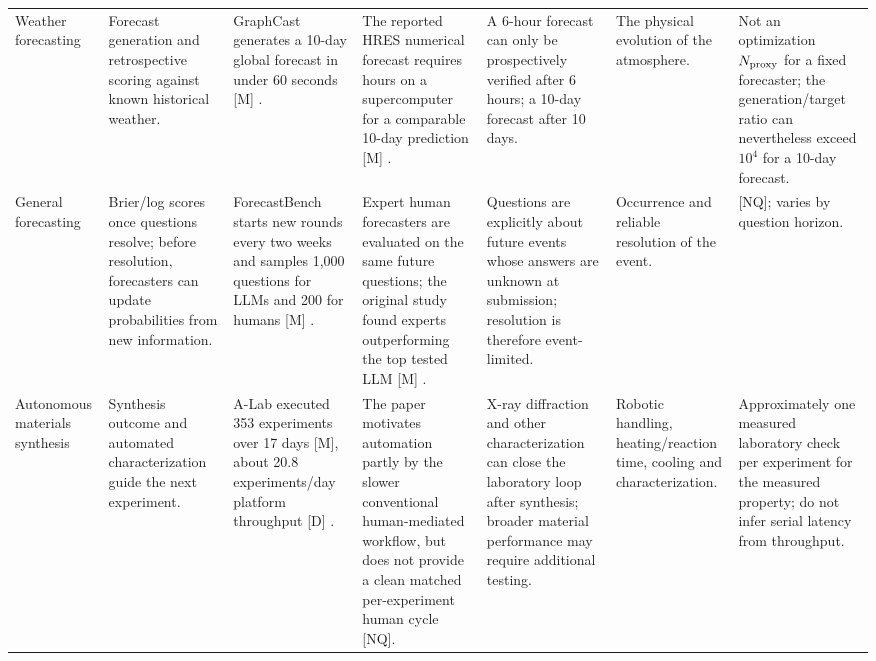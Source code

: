 \begin{landscape}
\begin{center}
\begin{longtable}{
    @{}
    p{2.0cm}
    p{3.0cm}
    p{2.85cm}
    p{2.75cm}
    p{3.05cm}
    p{2.75cm}
    p{2.55cm}
    @{}
}
\\[3pt]

Weather forecasting
&
Forecast generation and retrospective scoring against known historical
weather.
&
GraphCast generates a 10-day global forecast in under 60 seconds [M]
\parencite{lam2023graphcast}.
&
The reported HRES numerical forecast requires hours on a
supercomputer for a comparable 10-day prediction [M]
\parencite{lam2023graphcast}.
&
A 6-hour forecast can only be prospectively verified after 6 hours; a
10-day forecast after 10 days.
&
The physical evolution of the atmosphere.
&
Not an optimization $N_{\mathrm{proxy}}$ for a fixed forecaster; the generation/target
ratio can nevertheless exceed $10^4$ for a 10-day forecast.

\\[3pt]

General forecasting
&
Brier/log scores once questions resolve; before resolution, forecasters
can update probabilities from new information.
&
ForecastBench starts new rounds every two weeks and samples 1,000
questions for LLMs and 200 for humans [M]
\parencite{karger2025forecastbench}.
&
Expert human forecasters are evaluated on the same future questions;
the original study found experts outperforming the top tested LLM
[M] \parencite{karger2025forecastbench}.
&
Questions are explicitly about future events whose answers are unknown
at submission; resolution is therefore event-limited.
&
Occurrence and reliable resolution of the event.
&
[NQ]; varies by question horizon.

\\[3pt]

Autonomous materials synthesis
&
Synthesis outcome and automated characterization guide the next
experiment.
&
A-Lab executed 353 experiments over 17 days [M], about
20.8 experiments/day platform throughput [D]
\parencite{szymanski2023alab}.
&
The paper motivates automation partly by the slower conventional
human-mediated workflow, but does not provide a clean matched
per-experiment human cycle [NQ].
&
X-ray diffraction and other characterization can close the laboratory
loop after synthesis; broader material performance may require
additional testing.
&
Robotic handling, heating/reaction time, cooling and characterization.
&
Approximately one measured laboratory check per experiment for the
measured property; do not infer serial latency from throughput.

\\[3pt]


\end{longtable}
\end{center}
\end{landscape}
